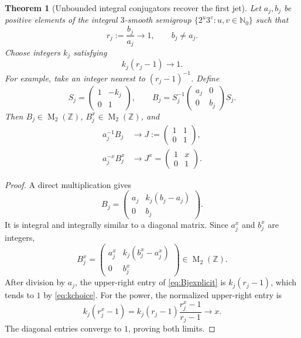 \documentclass[11pt,oneside]{article}
\newtheorem{theorem}{Theorem}[section]
\theoremstyle{definition}
\theoremstyle{remark}
\newcommand{\Nzero}{\mathbb N_0}
\newcommand{\Z}{\mathbb Z}
\newcommand{\Mat}{\operatorname{M}}
\begin{document}
\begin{theorem}[Unbounded integral conjugators recover the first jet]
\label{thm:splitdegeneration}
Let $a_j,b_j$ be positive elements of the integral $3$-smooth semigroup
$\{2^u3^v:u,v\in\Nzero\}$ such that
\begin{equation}
 r_j:=\frac{b_j}{a_j}\longrightarrow1,
 \qquad b_j\ne a_j.
 \label{eq:relativecollision}
\end{equation}
Choose integers $k_j$ satisfying
\begin{equation}
 k_j(r_j-1)\longrightarrow1.
 \label{eq:kchoice}
\end{equation}
For example, take an integer nearest to $(r_j-1)^{-1}$.  Define
\begin{equation}
 S_j=
 \begin{pmatrix}1&-k_j\\0&1\end{pmatrix},
 \qquad
 B_j=S_j^{-1}
 \begin{pmatrix}a_j&0\\0&b_j\end{pmatrix}S_j.
 \label{eq:Bj}
\end{equation}
Then $B_j\in\Mat_2(\Z)$, $B_j^x\in\Mat_2(\Z)$, and
\begin{align}
 a_j^{-1}B_j&\longrightarrow
 J:=\begin{pmatrix}1&1\\0&1\end{pmatrix},
 \label{eq:Bjlimit}\\
 a_j^{-x}B_j^x&\longrightarrow
 J^x=\begin{pmatrix}1&x\\0&1\end{pmatrix}.
 \label{eq:Bjxlimit}
\end{align}
\end{theorem}

\begin{proof}
A direct multiplication gives
\begin{equation}
 B_j=
 \begin{pmatrix}
 a_j&k_j(b_j-a_j)\\0&b_j
 \end{pmatrix}.
 \label{eq:Bjexplicit}
\end{equation}
It is integral and integrally similar to a diagonal matrix.  Since $a_j^x$ and $b_j^x$ are
integers,
\begin{equation}
 B_j^x=
 \begin{pmatrix}
 a_j^x&k_j(b_j^x-a_j^x)\\0&b_j^x
 \end{pmatrix}
 \in\Mat_2(\Z).
 \label{eq:Bjxexplicit}
\end{equation}
After division by $a_j$, the upper-right entry of \eqref{eq:Bjexplicit} is
$k_j(r_j-1)$, which tends to $1$ by \eqref{eq:kchoice}.  For the power, the normalized
upper-right entry is
\[
 k_j(r_j^x-1)
 =k_j(r_j-1)\frac{r_j^x-1}{r_j-1}
 \longrightarrow x.
\]
The diagonal entries converge to $1$, proving both limits.
\end{proof}
\end{document}

